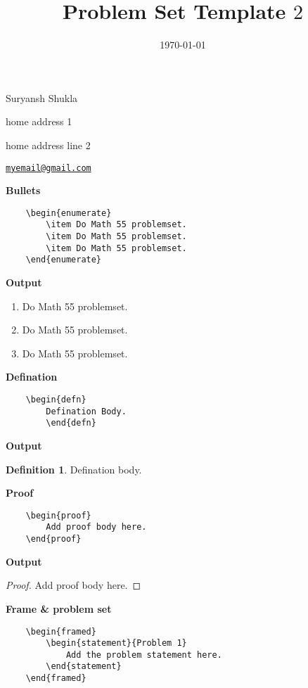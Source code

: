 \documentclass[12pt]{amsart}
\title{Problem Set Template $2$}
\date{\today}
\newenvironment{statement}[1]{\smallskip\noindent\color[rgb]{1.00,0.00,0.50} {\bf #1.}}{}
\theoremstyle{definition}
\newtheorem{defn}[theorem]{Definition}
\theoremstyle{remark}
\begin{document}
\maketitle

\vspace*{-0.25in}
\centerline{Suryansh Shukla}
\centerline{home address 1}
\centerline{home address line 2}
\centerline{\href{myemail@gmail.com}{{\tt myemail@gmail.com}}}
\vspace*{0.15in}

\begin{doublespace} %
\end{doublespace}
\singlespace %
\doublespace %
\textbf{Bullets}
\begin{verbatim} 
    \begin{enumerate}
        \item Do Math 55 problemset.
        \item Do Math 55 problemset.
        \item Do Math 55 problemset.
    \end{enumerate}
\end{verbatim}
\textbf{Output}
\begin{enumerate}
    \item Do Math 55 problemset.
    \item Do Math 55 problemset.
    \item Do Math 55 problemset.
\end{enumerate}
\textbf{Defination }
\begin{verbatim}
    \begin{defn}
        Defination Body.
        \end{defn}
\end{verbatim}
\textbf{Output}  
\begin{defn}
    Defination body.
\end{defn}

\textbf{Proof}
\begin{verbatim}
    \begin{proof}
        Add proof body here. 
    \end{proof}
\end{verbatim}
\textbf{Output}
\begin{proof}
    Add proof body here. 
\end{proof}

\textbf{Frame \& problem set}
\begin{verbatim}
    \begin{framed}
        \begin{statement}{Problem 1}
            Add the problem statement here.
        \end{statement}
    \end{framed}
\end{verbatim}
\end{document}
